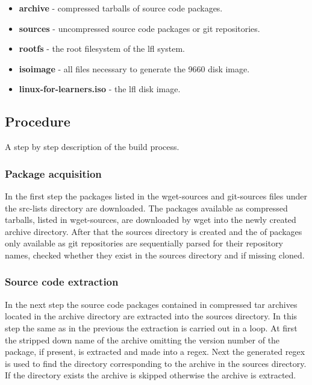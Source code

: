 \begin{itemize}
    \item \textbf{archive} - compressed tarballs of source code packages.
    \item \textbf{sources} - uncompressed source code packages or git repositories.
    \item \textbf{rootfs} - the root filesystem of the \gls{lfl} system.
    \item \textbf{isoimage} - all files necessary to generate the 9660 \cite{iso9660} disk image.
    \item \textbf{linux-for-learners.iso} - the \gls{lfl} disk image.
\end{itemize}

\newpage

\subsection{Procedure}

A step by step description of the build process.

\subsubsection{Package acquisition}

In the first step the packages listed in the wget-sources and git-sources files under the src-lists directory are downloaded. The packages available as compressed tarballs, listed in wget-sources, are downloaded by wget into the newly created archive directory. After that the sources directory is created and the  of packages only available as git repositories are sequentially parsed for their repository names, checked whether they exist in the sources directory and if missing cloned.


\subsubsection{Source code extraction}

In the next step the source code packages contained in compressed tar archives located in the archive directory are extracted into the sources directory. In this step the same as in the previous the extraction is carried out in a loop. At first the stripped down name of the archive omitting the version number of the package, if present, is extracted and made into a \gls{regex}. Next the generated \gls{regex} is used to find the directory corresponding to the archive in the sources directory. If the directory exists the archive is skipped otherwise the archive is extracted.

